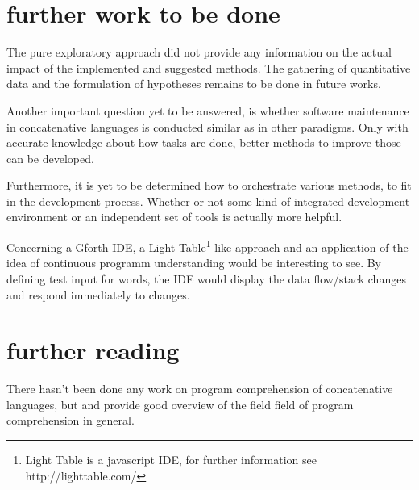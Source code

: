 \section{further work to be done}

The pure exploratory approach did not provide any information on the actual impact of the implemented and suggested methods. The gathering of quantitative data and the formulation of hypotheses remains to be done in future works.

Another important question yet to be answered, is whether software maintenance in concatenative languages is conducted similar as in other paradigms. Only with accurate knowledge about how tasks are done, better methods to improve those can be developed.

Furthermore, it is yet to be determined how to orchestrate various methods, to fit in the development process. Whether or not some kind of integrated development environment or an independent set of tools is actually more helpful.

Concerning a Gforth IDE, a Light Table\footnote{Light Table is a javascript IDE, for further information see http://lighttable.com/} like approach and an application of the idea of continuous programm understanding\cite{Muller:2000:RER:336512.336526} would be interesting to see. By defining test input for words, the IDE would display the data flow/stack changes and respond immediately to changes.


\section{further reading}

There hasn't been done any work on program comprehension of concatenative languages, but \cite{Canfora:2011:ACS:1924421.1924451} and \cite{Cornelissen2009} provide good overview of the field field of program comprehension in general.